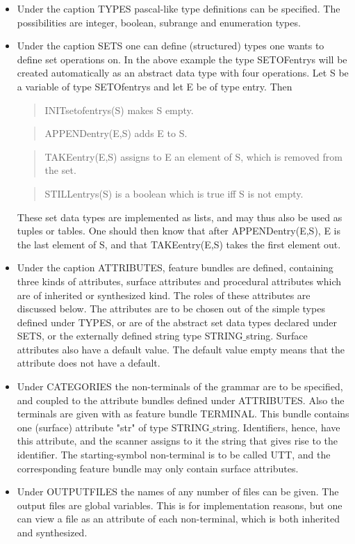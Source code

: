\begin{itemize}
\item
Under the caption TYPES pascal-like type definitions can be specified.
The possibilities are integer, boolean, subrange and enumeration types.
\item
Under the caption SETS one can define (structured) types one wants to define
set operations on. In the above example the type SETOFentrys will be created
automatically as an abstract data type with four operations. Let S be a
variable of type SETOfentrys and let E be of type entry. Then
\begin{quote}
INITsetofentrys(S) makes S empty.
\end{quote}
\begin{quote}
APPENDentry(E,S) adds E to S.
\end{quote}
\begin{quote}
TAKEentry(E,S) assigns to E an element of S, which is removed from the set.
\end{quote}
\begin{quote}
STILLentrys(S) is a boolean which is true iff S is not empty.
\end{quote}
These set data types are implemented as lists, and may thus also be used
as tuples or tables. One should then know that after APPENDentry(E,S), E
is the last element of S, and that TAKEentry(E,S) takes the first element
out.
\item
Under the caption ATTRIBUTES, feature bundles are defined, containing
three kinds of attributes, surface attributes and procedural attributes which
are of inherited or synthesized kind. The roles of these attributes are
discussed below. The attributes are to be chosen out of the simple types
defined under TYPES, or are of the abstract
set data types declared under SETS, or the externally defined string type
STRING$\_$string. Surface attributes also have a default value. The default
value empty means that the attribute does not have a default.
\item
Under CATEGORIES the non-terminals of the grammar are to be specified, and
coupled to the attribute bundles defined under ATTRIBUTES. Also the terminals
are given with as feature bundle TERMINAL. This bundle contains one (surface)
attribute "str" of type STRING$\_$string. Identifiers, hence, have this
attribute, and the scanner assigns to it the string that gives rise to the
identifier. The starting-symbol non-terminal is to be called UTT, and the
corresponding feature bundle may only contain surface attributes.
\item
Under OUTPUTFILES the names of any number of files can be given.
The output files are global variables. This is for implementation reasons,
but one can view a file as an attribute of each non-terminal, which is both
inherited and synthesized.
\end{itemize}

